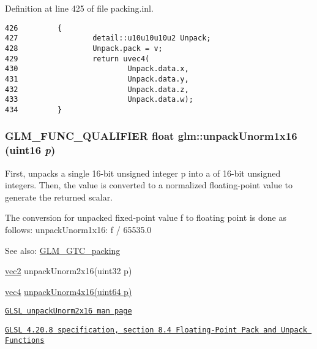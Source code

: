 Definition at line 425 of file packing.inl.

\begin{Code}\begin{verbatim}426         {
427                 detail::u10u10u10u2 Unpack;
428                 Unpack.pack = v;
429                 return uvec4(
430                         Unpack.data.x,
431                         Unpack.data.y,
432                         Unpack.data.z,
433                         Unpack.data.w);
434         }
\end{verbatim}
\end{Code}


\hypertarget{group__gtc__packing_g7770e3ade4f4764cc1b2eb42ac4ec188}{
\subsubsection[unpackUnorm1x16]{\setlength{\rightskip}{0pt plus 5cm}GLM\_\-FUNC\_\-QUALIFIER float glm::unpackUnorm1x16 (uint16 {\em p})}}
\label{group__gtc__packing_g7770e3ade4f4764cc1b2eb42ac4ec188}


First, unpacks a single 16-bit unsigned integer p into a of 16-bit unsigned integers. Then, the value is converted to a normalized floating-point value to generate the returned scalar.

The conversion for unpacked fixed-point value f to floating point is done as follows: unpackUnorm1x16: f / 65535.0

\begin{Desc}
\item[See also:]\hyperlink{group__gtc__packing}{GLM\_\-GTC\_\-packing} 

\hyperlink{group__core__types_ga1618f51db67eaa145db101d8c8431d8}{vec2} unpackUnorm2x16(uint32 p) 

\hyperlink{group__core__types_g5881b1b022d7fd1b7218f5916532dd02}{vec4} \hyperlink{group__gtc__packing_gfb2b502bc406031a5618ce930139a9e3}{unpackUnorm4x16(uint64 p)} 

\href{http://www.opengl.org/sdk/docs/manglsl/xhtml/unpackUnorm2x16.xml}{\tt GLSL unpackUnorm2x16 man page} 

\href{http://www.opengl.org/registry/doc/GLSLangSpec.4.20.8.pdf}{\tt GLSL 4.20.8 specification, section 8.4 Floating-Point Pack and Unpack Functions} \end{Desc}


